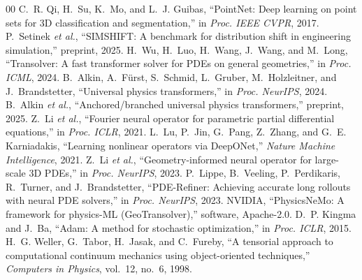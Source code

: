 \documentclass[conference]{IEEEtran}
\begin{document}
\begin{thebibliography}{00}
 C.~R. Qi, H.~Su, K.~Mo, and L.~J. Guibas, ``PointNet: Deep learning on point sets for 3D classification and segmentation,'' in \emph{Proc. IEEE CVPR}, 2017.
 P.~Setinek \emph{et al.}, ``SIMSHIFT: A benchmark for distribution shift in engineering simulation,'' preprint, 2025.
 H.~Wu, H.~Luo, H.~Wang, J.~Wang, and M.~Long, ``Transolver: A fast transformer solver for PDEs on general geometries,'' in \emph{Proc. ICML}, 2024.
 B.~Alkin, A.~F\"urst, S.~Schmid, L.~Gruber, M.~Holzleitner, and J.~Brandstetter, ``Universal physics transformers,'' in \emph{Proc. NeurIPS}, 2024.
 B.~Alkin \emph{et al.}, ``Anchored/branched universal physics transformers,'' preprint, 2025.
 Z.~Li \emph{et al.}, ``Fourier neural operator for parametric partial differential equations,'' in \emph{Proc. ICLR}, 2021.
 L.~Lu, P.~Jin, G.~Pang, Z.~Zhang, and G.~E. Karniadakis, ``Learning nonlinear operators via DeepONet,'' \emph{Nature Machine Intelligence}, 2021.
 Z.~Li \emph{et al.}, ``Geometry-informed neural operator for large-scale 3D PDEs,'' in \emph{Proc. NeurIPS}, 2023.
 P.~Lippe, B.~Veeling, P.~Perdikaris, R.~Turner, and J.~Brandstetter, ``PDE-Refiner: Achieving accurate long rollouts with neural PDE solvers,'' in \emph{Proc. NeurIPS}, 2023.
 NVIDIA, ``PhysicsNeMo: A framework for physics-ML (GeoTransolver),'' software, Apache-2.0.
 D.~P. Kingma and J.~Ba, ``Adam: A method for stochastic optimization,'' in \emph{Proc. ICLR}, 2015.
 H.~G. Weller, G.~Tabor, H.~Jasak, and C.~Fureby, ``A tensorial approach to computational continuum mechanics using object-oriented techniques,'' \emph{Computers in Physics}, vol.~12, no.~6, 1998.
\end{thebibliography}
\end{document}

